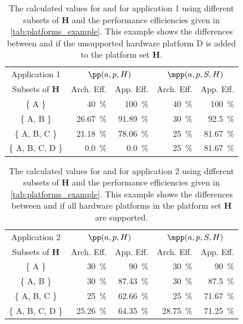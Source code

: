 \begin{table}[]
    \centering
    \begin{tabular}{c|rrrr}
        
        Application 1           & \multicolumn{2}{c}{$\pp(a, p, H)$}          & \multicolumn{2}{c}{$\mpp(a, p, S, H)$}   \\
        Subsets of $\mathbf{H}$ & Arch. Eff.           & App. Eff.            & Arch. Eff.        & App. Eff.            \\\midrule
        \{ A \}                 & \SI{40}{\percent}    & \SI{100}{\percent}   & \SI{40}{\percent} & \SI{100}{\percent}    \\
        \{ A, B \}              & \SI{26.67}{\percent} & \SI{91.89}{\percent} & \SI{30}{\percent} & \SI{92.5}{\percent}  \\
        \{ A, B, C \}           & \SI{21.18}{\percent} & \SI{78.06}{\percent} & \SI{25}{\percent} & \SI{81.67}{\percent} \\
        \{ A, B, C, D \}        & \SI{0.0}{\percent}   & \SI{0.0}{\percent}   & \SI{25}{\percent} & \SI{81.67}{\percent} 
    \end{tabular}
    \caption{%
    The calculated values for \pp and \mpp for application 1 using different subsets of $\mathbf{H}$ and the performance efficiencies given in \autoref{tab:platforms_example}. 
    This example shows the differences between \pp and \mpp if the unsupported hardware platform D is added to the platform set $\mathbf{H}$.
    }
    \label{tab:pp_app_1_example}
\end{table}

\begin{table}[]
    \centering
    \begin{tabular}{c|rrrr}
        Application 2           & \multicolumn{2}{c}{$\pp(a, p, H)$}          & \multicolumn{2}{c}{$\mpp(a, p, S, H)$}      \\
        Subsets of $\mathbf{H}$ & Arch. Eff.           & App. Eff.            & Arch. Eff.           & App. Eff.            \\\midrule
        \{ A \}                 & \SI{30}{\percent}    & \SI{90}{\percent}    & \SI{30}{\percent}    & \SI{90}{\percent}    \\
        \{ A, B \}              & \SI{30}{\percent}    & \SI{87.43}{\percent} & \SI{30}{\percent}    & \SI{87.5}{\percent}  \\
        \{ A, B, C \}           & \SI{25}{\percent}    & \SI{62.66}{\percent} & \SI{25}{\percent}    & \SI{71.67}{\percent} \\
        \{ A, B, C, D \}        & \SI{25.26}{\percent} & \SI{64.35}{\percent} & \SI{28.75}{\percent} & \SI{71.25}{\percent}
    \end{tabular}
    \caption{%
    The calculated values for \pp and \mpp for application 2 using different subsets of $\mathbf{H}$ and the performance efficiencies given in \autoref{tab:platforms_example}. 
    This example shows the differences between \pp and \mpp if all hardware platforms in the platform set $\mathbf{H}$ are supported.
    }
    \label{tab:pp_app_2_example}
\end{table}